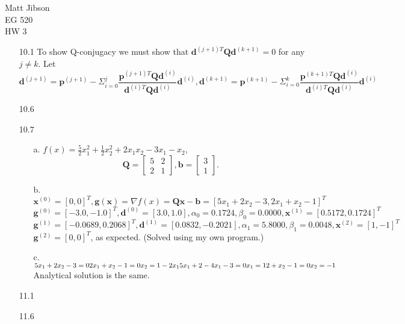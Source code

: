 \documentclass{article}
\begin{document}
\begin{flushright}
Matt Jibson \\
EG 520 \\
HW 3
\end{flushright}

\begin{itemize}
	\item[10.1]
		To show Q-conjugacy we must show that $\boldsymbol{d}^{(j+1)T} \boldsymbol{Q} \boldsymbol{d}^{(k+1)} = 0$ for any $j \ne k$.
		Let \begin{displaymath}
			\boldsymbol{d}^{(j+1)} = \boldsymbol{p}^{(j+1)} - \Sigma_{i=0}^{j} \frac{\boldsymbol{p}^{(j+1)T} \boldsymbol{Q} \boldsymbol{d}^{(i)}}{\boldsymbol{d}^{(i)T} \boldsymbol{Q} \boldsymbol{d}^{(i)}} \boldsymbol{d}^{(i)},
			\boldsymbol{d}^{(k+1)} = \boldsymbol{p}^{(k+1)} - \Sigma_{i=0}^{k} \frac{\boldsymbol{p}^{(k+1)T} \boldsymbol{Q} \boldsymbol{d}^{(i)}}{\boldsymbol{d}^{(i)T} \boldsymbol{Q} \boldsymbol{d}^{(i)}} \boldsymbol{d}^{(i)}
		\end{displaymath}
	\item[10.6]
	\item[10.7] \begin{itemize}
		\item[a.] $f(x) = \frac{5}{2} x_1^2 + \frac{1}{2} x_2^2 + 2 x_1 x_2 - 3 x_1 - x_2$,
			\begin{displaymath}
				\boldsymbol{Q} = \left[ \begin{array}{cc} 5 & 2 \\ 2 & 1 \end{array} \right],
				\boldsymbol{b} = \left[ \begin{array}{c} 3 \\ 1 \end{array} \right].
			\end{displaymath}
		\item[b.] $\boldsymbol{x}^{(0)} = [0, 0]^T, \boldsymbol{g}(\boldsymbol{x}) = \nabla f(x) = \boldsymbol{Qx - b} = [5x_1 + 2x_2 - 3, 2 x_1 + x_2 - 1]^T$ \\
			$\boldsymbol{g}^{(0)} = [-3.0, -1.0]^T, \boldsymbol{d}^{(0)} = [3.0, 1.0], \alpha_0 = 0.1724, \beta_0 = 0.0000, \boldsymbol{x}^{(1)} = [0.5172, 0.1724]^T$ \\
			$\boldsymbol{g}^{(1)} = [-0.0689, 0.2068]^T, \boldsymbol{d}^{(1)} = [0.0832, -0.2021], \alpha_1 = 5.8000, \beta_1 = 0.0048, \boldsymbol{x}^{(2)} = [1, -1]^T$ \\
			$\boldsymbol{g}^{(2)} = [0, 0]^T$, as expected. (Solved using my own program.)
		\item[c.]
				$5x_1 + 2x_2 - 3 = 0 \\
				2x_1 + x_2 - 1 = 0 \\
				x_2 = 1 - 2x_1 \\
				5x_1 + 2 - 4x_1 - 3 = 0 \\
				x_1 = 1 \\
				2 + x_2 - 1 = 0 \\
				x_2 = -1$ \\
				Analytical solution is the same.
		\end{itemize}
	\item[11.1]
	\item[11.6]
\end{itemize}
\end{document}
